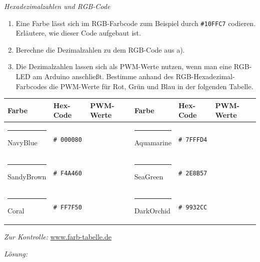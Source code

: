 \documentclass[ngerman, 11pt]{scrreprt}
\begin{document}
	\newpage
	\begin{aufgabe} \emph{Hexadezimalzahlen und RGB-Code}
		
		\begin{enumerate}[label=\alph*), itemsep=0mm,parsep=0mm]
			\item Eine Farbe lässt sich im RGB-Farbcode zum Beispiel durch \texttt{\#10FFC7} codieren. Erläutere, wie dieser Code aufgebaut ist.
			\item Berechne die Dezimalzahlen zu dem RGB-Code aus a).
			\item Die Dezimalzahlen lassen sich als PWM-Werte nutzen, wenn man eine RGB-LED am Arduino anschließt. Bestimme anhand des RGB-Hexadezimal-Farbcodes die PWM-Werte für Rot, Grün und Blau in der folgenden Tabelle.
		\end{enumerate}
		\vspace{-\baselineskip}
		\begin{table}[H]
			\centering
			\begin{minipage}[c]{\textwidth}
				\begin{tabu} to \textwidth {X[L,2]X[L]X[L]|X[L,2]X[L]X[L]}
					\toprule
					\textbf{Farbe} & \textbf{Hex-Code} & \textbf{PWM-Werte} & \textbf{Farbe} & \textbf{Hex-Code} & \textbf{PWM-Werte} \\
					\midrule
					\textcolor{navyblue}{\rule{1cm}{0.4cm}} NavyBlue	& \texttt{\# 000080} &  & \textcolor{aquamarine}{\rule{1cm}{0.4cm}} Aquamarine & \texttt{\# 7FFFD4} &  \\ 
					\textcolor{sandybrown}{\rule{1cm}{0.4cm}} SandyBrown	& \texttt{\# F4A460} &  & \textcolor{seagreen}{\rule{1cm}{0.4cm}} SeaGreen & \texttt{\# 2E8B57} &  \\
					\textcolor{coral}{\rule{1cm}{0.4cm}} Coral	& \texttt{\# FF7F50} &  & \textcolor{darkorchid}{\rule{1cm}{0.4cm}} DarkOrchid & \texttt{\# 9932CC} &  \\
					\bottomrule
				\end{tabu}
			\end{minipage}
			\label{tab:rgb-codes3}
		\end{table}
		\emph{Zur Kontrolle:} \href{www.farb-tabelle.de/de/farbtabelle.htm}{www.farb-tabelle.de}
	\end{aufgabe}
	
	\bigskip
	\emph{Lösung:}
	
\end{document}

